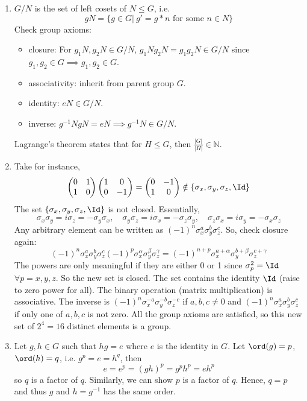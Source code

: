 \documentclass[a4paper]{article}
\begin{document}
\begin{ans}\leavevmode
\begin{enumerate}[label=(\alph*)]
\item $G/N$ is the set of left cosets of $N\leq G$, i.e.
$$gN=\{g\in G|~g'=g*n\text{ for some }n\in N\}$$
Check group axioms:
\begin{itemize}
    \item closure: For $g_1N,g_2N\in G/N$, $g_1Ng_2N=g_1g_2N\in G/N$ since $g_1,g_2\in G\implies g_1,g_2\in G$.
    \item associativity: inherit from parent group $G$.
    \item identity: $eN\in G/N$.
    \item inverse: $g^{-1}NgN=eN\implies g^{-1}N\in G/N$.
\end{itemize}
Lagrange's theorem states that for $H\leq G$, then $\frac{|G|}{|H|}\in\mathbb{N}$.
\item Take for instance,
$$\begin{pmatrix}0&1\\1&0\\\end{pmatrix}\begin{pmatrix}1&0\\0&-1\\\end{pmatrix}=\begin{pmatrix}0&-1\\1&0\\\end{pmatrix}\notin\{\sigma_x,\sigma_y,\sigma_z,\Id\}$$
The set $\{\sigma_x,\sigma_y,\sigma_z,\Id\}$ is not closed. Essentially,
$$\sigma_x\sigma_y=i\sigma_z=-\sigma_y\sigma_x,\quad\sigma_y\sigma_z=i\sigma_x=-\sigma_z\sigma_y,\quad \sigma_z\sigma_x=i\sigma_y=-\sigma_x\sigma_z$$
Any arbitrary element can be written as $(-1)^n\sigma_x^a\sigma_y^b\sigma_z^c$. So, check closure again:
$$(-1)^n\sigma_x^a\sigma_y^b\sigma_z^c(-1)^p\sigma_x^\alpha\sigma_y^\beta\sigma_z^\gamma=(-1)^{n+p}\sigma_x^{a+\alpha}\sigma_y^{b
+\beta}\sigma_z^{c+\gamma}$$
The powers are only meaningful if they are either 0 or 1 since $\sigma_p^2=\Id$ $\forall p=x,y,z$. So the new set is closed. The set contains the identity $\Id$ (raise to zero power for all). The binary operation (matrix multiplication) is associative. The inverse is $(-1)^n\sigma_x^{-a}\sigma_y^{-b}\sigma_z^{-c}$ if $a,b,c\neq 0$ and $(-1)^n\sigma_x^a\sigma_y^b\sigma_z^c$ if only one of $a,b,c$ is not zero. All the group axioms are satisfied, so this new set of $2^4=16$ distinct elements is a group.
\item Let $g,h\in G$ such that $hg=e$ where $e$ is the identity in $G$. Let $\ord(g)=p$, $\ord(h)=q$, i.e. $g^p=e=h^q$, then 
$$e=e^p=(gh)^p=g^ph^p=eh^p$$
so $q$ is a factor of $q$. Similarly, we can show $p$ is a factor of $q$. Hence, $q=p$ and thus $g$ and $h=g^{-1}$ has the same order.

\end{enumerate}
\end{ans}
\end{document}
